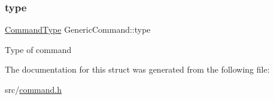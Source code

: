 \subsubsection{\texorpdfstring{type}{type}}
{\footnotesize\ttfamily \hyperlink{command_8h_a21e038f5b8958e203d28bc4f18472352}{Command\+Type} Generic\+Command\+::type}

Type of command 

The documentation for this struct was generated from the following file\+:\begin{DoxyCompactItemize}
\item 
src/\hyperlink{command_8h}{command.\+h}\end{DoxyCompactItemize}
